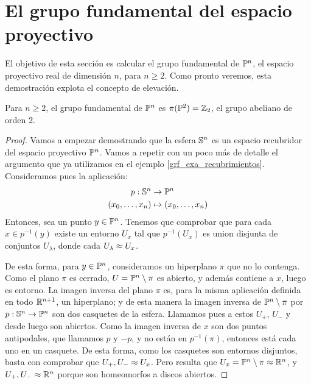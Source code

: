 \section{El grupo fundamental del espacio proyectivo}

El objetivo de esta sección es calcular el grupo fundamental de $\mathbb{P}^n$, el espacio proyectivo real de dimensión $n$, para $n\geq 2$. Como pronto veremos, esta demostración explota el concepto de elevación. 

\begin{theo}
	\label{grf_espacio_proyectivo}
	
	Para $n\geq 2$, el grupo fundamental de  $\mathbb{P}^n$ es $\pi(\mathbb{P}^2)=\mathbb{Z}_2$, el grupo abeliano de orden 2.
	
	\begin{proof}
		Vamos a empezar demostrando que la esfera $\mathbb{S}^n$ es un espacio recubridor del espacio proyectivo $\mathbb{P}^n$. Vamos a repetir con un poco más de detalle el argumento que ya utilizamos en el ejemplo \ref{grf_exa_recubrimientos}. Consideramos pues la aplicación:
		\[\begin{split}
		p:\mathbb{S}^n&\to\mathbb{P}^n \\
		(x_0,\dots,x_n)&\mapsto (x_0,\dotsc,x_n)
		\end{split}\]
		Entonces, sea un punto $y\in\mathbb{P}^n$. Tenemos que comprobar que para cada $x\in p^{-1}(y)$ existe un entorno $U_x$ tal que $p^{-1}(U_x)$ es union disjunta de conjuntos $U_\lambda$, donde cada $U_\lambda\approx U_x$.
		
		De esta forma, para $y\in\mathbb{P}^n$, consideramos un hiperplano $\pi$ que no lo contenga. Como el plano $\pi$ es cerrado, $U=\mathbb{P}^n\setminus\pi$ es abierto, y además contiene a $x$, luego es entorno. La imagen inversa del plano $\pi$ es, para la misma aplicación definida en todo $\mathbb{R}^{n+1}$, un hiperplano; y de esta manera la imagen inversa de $\mathbb{P}^n\setminus\pi$ por $p:\mathbb{S}^n\to\mathbb{P}^n$ son dos casquetes de la esfera. Llamamos pues a estos $U_+$, $U_-$ y desde luego son abiertos. Como la imagen inversa de $x$ son dos puntos antipodales, que llamamos $p$ y $-p$, y no están en $p^{-1}(\pi)$, entonces está cada uno en un casquete. De esta forma, como los casquetes son entornos disjuntos, basta con comprobar que $U_+,U_-\approx U_x$. Pero resulta que $U_x = \mathbb{P}^n\setminus\pi\approx\mathbb{R}^n$, y $U_+,U_-\approx\mathbb{R}^n$ porque son homeomorfos a discos abiertos.
		

\end{proof}
\end{theo}
